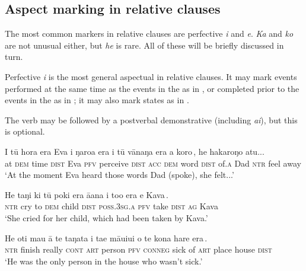 \subsection{Aspect marking in relative clauses}\label{sec:11.4.3}
The most common  markers in relative clauses are perfective \textit{i} and  \textit{e}. \textit{Ka} and \textit{ko} are not unusual either, but \textit{he} is rare. All of these will be briefly discussed in turn.

Perfective \textit{i} is the most general aspectual in relative clauses. It may mark events performed at the same time as the events in the  as in , or completed prior to the events in the  as in ; it may also mark states as in .

The verb may be followed by a postverbal demonstrative (including \textit{ai}), but this is optional.

\ea\label{ex:11.110}
\gll {\ꞌ}I tū hora era {\ob}Eva i ŋaro{\ꞌ}a era i tū vānaŋa era {\ꞌ}a koro\,{\cb},  he hakaroŋo atu...\\
at \textsc{dem} time \textsc{dist} {\db}Eva \textsc{pfv} perceive \textsc{dist} \textsc{acc} \textsc{dem} word \textsc{dist} of\textsc{.a} Dad  \textsc{ntr} feel away\\

\glt 
‘At the moment Eva heard those words Dad (spoke), she felt...’ \textstyleExampleref{[R210.075]} 
\z

\ea\label{ex:11.111}
\gll He taŋi ki tū poki era {\ꞌ}ā{\ꞌ}ana {\ob}i to{\ꞌ}o era e Kava\,{\cb}. \\
\textsc{ntr} cry to \textsc{dem} child \textsc{dist} \textsc{poss.3sg.a} {\db}\textsc{pfv} take \textsc{dist} \textsc{ag} Kava \\

\glt 
‘She cried for her child, which had been taken by Kava.’ \textstyleExampleref{[R229.095]} 
\z

\ea\label{ex:11.112}
\gll He oti mau {\ꞌ}ā te taŋata {\ob}i ta{\ꞌ}e māuiui o te kona hare era\,{\cb}.\\
\textsc{ntr} finish really \textsc{cont} \textsc{art} person {\db}\textsc{pfv} \textsc{conneg} sick of \textsc{art} place house \textsc{dist}\\

\glt 
‘He was the only person in the house who wasn’t sick.’ \textstyleExampleref{[R250.091]} 
\z

